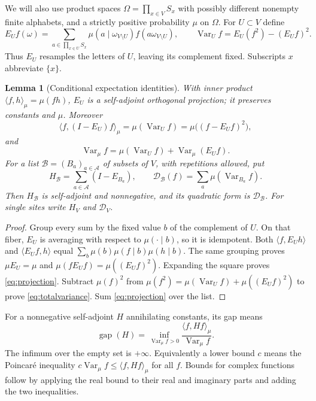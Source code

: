 \documentclass[11pt]{amsart}
\newtheorem{lemma}[theorem]{Lemma}
\theoremstyle{definition}
\newcommand{\Var}{\operatorname{Var}}
\newcommand{\gap}{\operatorname{gap}}
\newcommand{\cD}{\mathcal D}
\newcommand{\1}{\mathbf 1}
\newcommand{\Om}{\Omega}
\begin{document}
We will also use product spaces $\Om=\prod_{x\in V}S_x$ with possibly
different nonempty finite alphabets, and a strictly positive probability
$\mu$ on $\Om$. For $U\subset V$ define
\[
 E_Uf(\omega)=\sum_{a\in\prod_{x\in U}S_x}
      \mu(a\mid\omega_{V\setminus U})f(a\omega_{V\setminus U}),
 \qquad \Var_U f=E_U(f^2)-(E_Uf)^2.
\]
Thus $E_U$ resamples the letters of $U$, leaving its complement fixed.
Subscripts $x$ abbreviate $\{x\}$.

\begin{lemma}[Conditional expectation identities]
\label{lem:CE}
With inner product $\langle f,h\rangle_\mu=\mu(fh)$, $E_U$ is a
self-adjoint orthogonal projection; it preserves constants and $\mu$.
Moreover
\begin{equation}\label{eq:projection}
 \langle f,(I-E_U)f\rangle_\mu=\mu(\Var_Uf)
          =\mu\bigl((f-E_Uf)^2\bigr),
\end{equation}
and
\begin{equation}\label{eq:totalvariance}
 \Var_\mu f=\mu(\Var_Uf)+\Var_\mu(E_Uf).
\end{equation}
For a list $\mathscr B=(B_a)_{a\in\mathcal A}$ of subsets of $V$, with
repetitions allowed, put
\[
 H_{\mathscr B}=\sum_{a\in\mathcal A}(I-E_{B_a}),\qquad
 \cD_{\mathscr B}(f)=\sum_a\mu(\Var_{B_a}f).
\]
Then $H_{\mathscr B}$ is self-adjoint and nonnegative, and its quadratic
form is $\cD_{\mathscr B}$. For single sites write $H_V$ and $\cD_V$.
\end{lemma}
\begin{proof}
Group every sum by the fixed value $b$ of the complement of $U$. On that
fiber, $E_U$ is averaging with respect to $\mu(\cdot\mid b)$, so it is
idempotent. Both $\langle f,E_Uh\rangle$ and
$\langle E_Uf,h\rangle$ equal
$\sum_b\mu(b)\mu(f\mid b)\mu(h\mid b)$.
The same grouping proves $\mu E_U=\mu$ and
$\mu(fE_Uf)=\mu((E_Uf)^2)$. Expanding the square proves
\eqref{eq:projection}. Subtract $\mu(f)^2$ from
$\mu(f^2)=\mu(\Var_Uf)+\mu((E_Uf)^2)$ to prove
\eqref{eq:totalvariance}. Sum \eqref{eq:projection} over the list.
\end{proof}

For a nonnegative self-adjoint $H$ annihilating constants, its gap means
\[
 \gap(H)=\inf_{\Var_\mu f>0}
       \frac{\langle f,Hf\rangle_\mu}{\Var_\mu f}.
\]
The infimum over the empty set is $+\infty$. Equivalently a lower bound $c$
means the Poincar\'e inequality
$c\Var_\mu f\le\langle f,Hf\rangle_\mu$ for all $f$.
Bounds for complex functions follow by applying the real bound to their
real and imaginary parts and adding the two inequalities.
\end{document}
